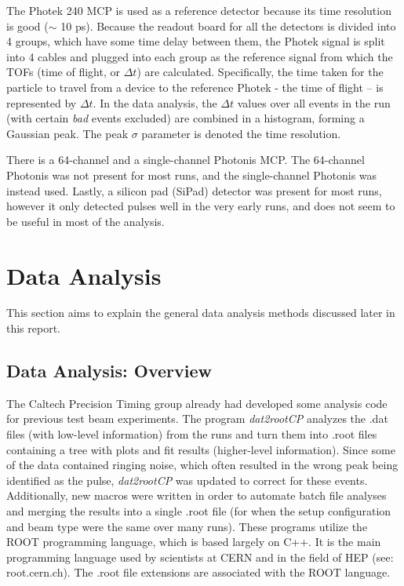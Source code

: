 \documentclass[12pt]{article}
\begin{document}
The Photek 240 MCP is used as a reference detector because its time resolution is good ($\sim$ 10 ps). 
Because the readout board for all the detectors is divided into 4 groups, which have some time delay between them, the Photek signal is split into 4 cables and plugged into each group as the reference signal from which the TOFs (time of flight, or $\Delta t$) are calculated. 
Specifically, the time taken for the particle to travel from a device to the reference Photek - the time of flight – is represented by $\Delta t$. 
In the data analysis, the $\Delta t$ values over all events in the run (with certain \textit{bad} events excluded) are combined in a histogram, forming a Gaussian peak. 
The peak $\sigma$ parameter is denoted the time resolution.

There is a 64-channel and a single-channel Photonis MCP. 
The 64-channel Photonis was not present for most runs, and the single-channel Photonis was instead used. 
Lastly, a silicon pad (SiPad) detector was present for most runs, however it only detected pulses well in the very early runs, and does not seem to be useful in most of the analysis.

\section{Data Analysis}
This section aims to explain the general data analysis methods discussed later in this report.

\subsection{Data Analysis: Overview}
The Caltech Precision Timing group already had developed some analysis code for previous test beam experiments. 
The program \textit{dat2rootCP} analyzes the .dat files (with low-level information) from the runs and turn them into .root files containing a tree with plots and fit results (higher-level information). 
Since some of the data contained ringing noise, which often resulted in the wrong peak being identified as the pulse, \textit{dat2rootCP} was updated to correct for these events. 
Additionally, new macros were written in order to automate batch file analyses and merging the results into a single .root file (for when the setup configuration and beam type were the same over many runs). 
These programs utilize the ROOT programming language, which is based largely on C++. 
It is the main programming language used by scientists at CERN and in the field of HEP (see: root.cern.ch).  
The .root file extensions are associated with the ROOT language.
\end{document}
